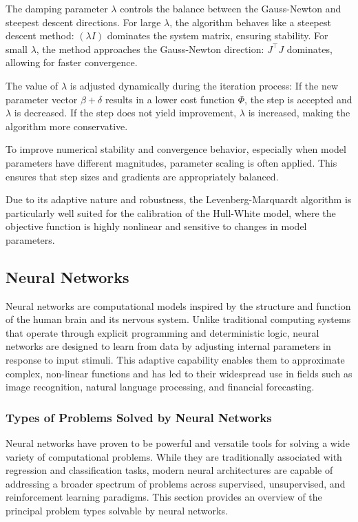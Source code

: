 The damping parameter $\lambda$ controls the balance between the Gauss-Newton and steepest descent directions. For large $\lambda$, the algorithm behaves like a steepest descent method: $(\lambda I)$ dominates the system matrix, ensuring stability. For small $\lambda$, the method approaches the Gauss-Newton direction: $J^\top J$ dominates, allowing for faster convergence.

The value of $\lambda$ is adjusted dynamically during the iteration process:
If the new parameter vector $\beta + \delta$ results in a lower cost function $\Phi$, the step is accepted and $\lambda$ is decreased. If the step does not yield improvement, $\lambda$ is increased, making the algorithm more conservative.

To improve numerical stability and convergence behavior, especially when model parameters have different magnitudes, parameter scaling is often applied. This ensures that step sizes and gradients are appropriately balanced.

Due to its adaptive nature and robustness, the Levenberg-Marquardt algorithm is particularly well suited for the calibration of the Hull-White model, where the objective function is highly nonlinear and sensitive to changes in model parameters.

\subsection{Neural Networks}
Neural networks are computational models inspired by the structure and function of the human brain and its nervous system. Unlike traditional computing systems that operate through explicit programming and deterministic logic, neural networks are designed to learn from data by adjusting internal parameters in response to input stimuli. This adaptive capability enables them to approximate complex, non-linear functions and has led to their widespread use in fields such as image recognition, natural language processing, and financial forecasting.

\subsubsection{Types of Problems Solved by Neural Networks}
Neural networks have proven to be powerful and versatile tools for solving a wide variety of computational problems. While they are traditionally associated with regression and classification tasks, modern neural architectures are capable of addressing a broader spectrum of problems across supervised, unsupervised, and reinforcement learning paradigms. This section provides an overview of the principal problem types solvable by neural networks.

